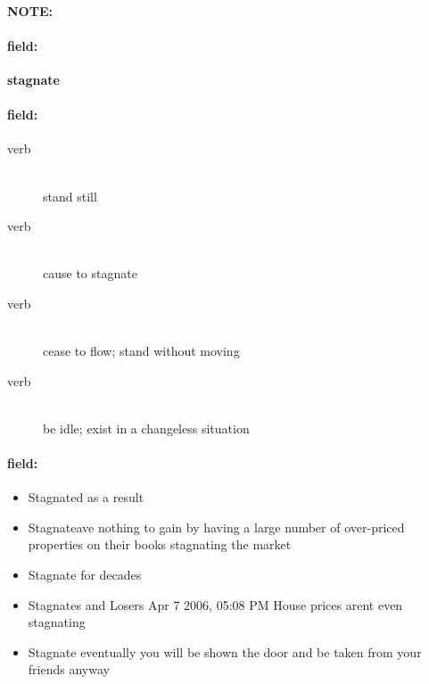 \documentclass[12pt]{article}
\newenvironment{note}{\paragraph{NOTE:}}{}
\newenvironment{field}{\paragraph{field:}}{}
\begin{document}
\begin{note}
\begin{field}
\textbf{\large stagnate}
\end{field}


\begin{field}
\begin{description}
\item[verb] \hfill \\ 
stand still

\item[verb] \hfill \\ 
cause to stagnate

\item[verb] \hfill \\ 
cease to flow; stand without moving

\item[verb] \hfill \\ 
be idle; exist in a changeless situation

\end{description}
\end{field}

\begin{field}
\begin{itemize}
\item Stagnated as a result
\item Stagnateave nothing to gain by having a large number of over-priced properties on their books stagnating the market
\item Stagnate for decades
\item Stagnates and Losers Apr 7 2006, 05:08 PM House prices arent even stagnating
\item Stagnate eventually you will be shown the door and be taken from your friends anyway
\end{itemize}
\end{field}
\end{note}
\end{document}
